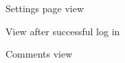 \begin{figure}[ht!]
	\caption{Settings page view}
\label{fig:ui8}
\end{figure}

\begin{figure}[ht!]
	\caption{View after successful log in}
\label{fig:ui9}
\end{figure}

\begin{figure}[ht!]
	\caption{Comments view}
\label{fig:ui10}
\end{figure}